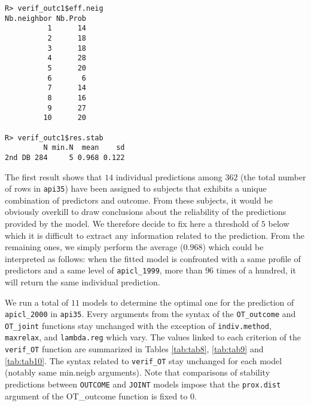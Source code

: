 \begin{verbatim}
R> verif_outc1$eff.neig
Nb.neighbor Nb.Prob
          1      14
          2      18
          3      18
          4      28
          5      20
          6       6
          7      14
          8      16
          9      27
         10      20

R> verif_outc1$res.stab
         N min.N  mean    sd
2nd DB 284     5 0.968 0.122
\end{verbatim}

The first result shows that \(14\) individual predictions among \(362\) (the total number of rows in \texttt{api35}) have been assigned to subjects that exhibits a unique combination of predictors and outcome. From these subjects, it would be obviously overkill to draw conclusions about the reliability of the predictions provided by the model. We therefore decide to fix here a threshold of \(5\) below which it is difficult to extract any information related to the prediction. From the remaining ones, we simply perform the average (\(0.968\)) which could be interpreted as follows: when the fitted model is confronted with a same profile of predictors and a same level of \texttt{apicl\_1999}, more than \(96\) times of a hundred, it will return the same individual prediction.

We run a total of \(11\) models to determine the optimal one for the prediction of \texttt{apicl\_2000} in \texttt{api35}.
Every arguments from the syntax of the \texttt{OT\_outcome} and \texttt{OT\_joint} functions stay unchanged with the exception of \texttt{indiv.method}, \texttt{maxrelax}, and \texttt{lambda.reg} which vary.
The values linked to each criterion of the \texttt{verif\_OT} function are summarized in Tables \ref{tab:tab8}, \ref{tab:tab9} and \ref{tab:tab10}. The syntax related to \texttt{verif\_OT} stay unchanged for each model (notably same min.neigb arguments). Note that comparisons of stability predictions between \texttt{OUTCOME} and \texttt{JOINT} models impose that the \texttt{prox.dist} argument of the OT\_outcome function is fixed to \(0\).

